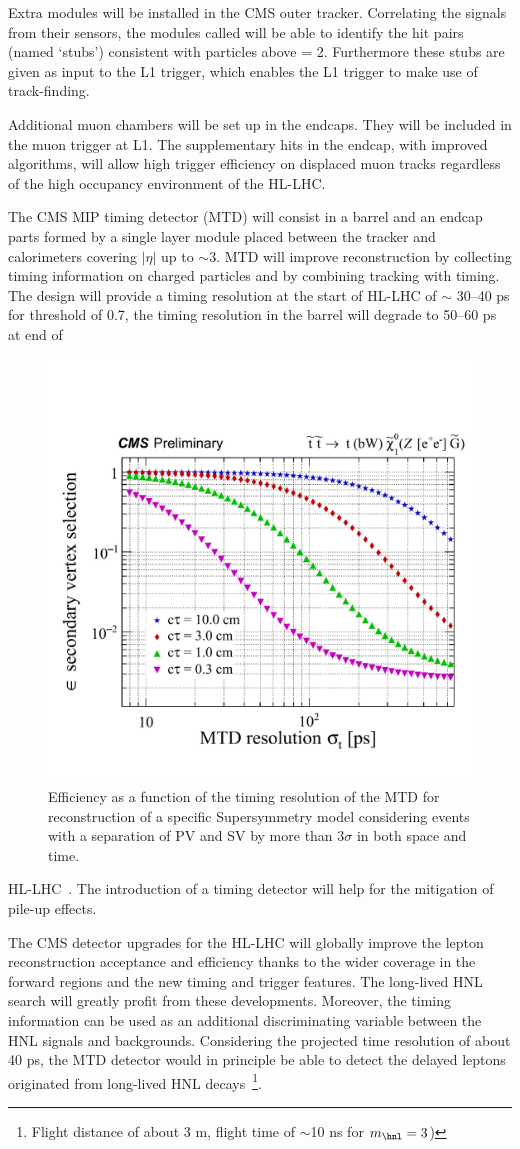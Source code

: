 Extra modules will be installed in
the CMS outer tracker. Correlating the signals from their sensors, the modules called \pt will be able to identify
the hit pairs (named ‘stubs’) consistent with particles above \pt =
2\GeV. Furthermore these stubs are given as input to the L1 trigger, which enables the L1 trigger to make use of track-finding.

Additional muon chambers will be set up in the endcaps. They will be included in
the muon trigger at L1. The supplementary hits in the
endcap, with improved algorithms, will allow high trigger efficiency 
on displaced muon tracks regardless of the high occupancy environment of the HL-LHC.
 
The CMS MIP timing detector (MTD) will
consist in a barrel and an endcap parts formed by a single layer
module placed between the tracker
and calorimeters covering $|\eta|$ up to $\sim$3.
MTD will improve reconstruction by collecting timing information on
charged particles and by combining tracking with timing. The design will provide a timing resolution
at the start of HL-LHC of $\sim$ 30--40 ps for \pt threshold of
0.7\GeV, the timing resolution in the barrel will degrade to 50--60 ps
at end of
\begin{figure}
\centering
    \includegraphics[clip,trim=0.5cm 1cm 0.cm 3cm, width=.45\textwidth]{Figures/c7/MDT.pdf}
\caption{ 
Efficiency as a function of the timing
resolution of the MTD for reconstruction of a specific Supersymmetry
model considering events with a separation of
PV and SV by more than 3$\sigma$ in both space and time\cite{Alimena_2020}.}
\label{fig:MDT_alimena}
\end{figure}
 HL-LHC~\cite{Marta}. The introduction of a timing detector will help for
the mitigation of pile-up effects.

The CMS detector upgrades for the HL-LHC will globally improve the lepton
reconstruction acceptance
and efficiency thanks to the wider coverage in the forward regions and the new timing
and trigger features. The long-lived HNL search will greatly profit
from these developments. Moreover, the timing information can be used
as an additional discriminating variable between the HNL signals and
backgrounds. Considering the projected time resolution of about 40 ps,
the MTD detector would in principle be able to detect the delayed
leptons originated from long-lived HNL decays~\footnote{Flight
  distance of about 3 m, flight time of $\sim$10 ns
for $m_\hnl = 3$\GeV)}.\\

